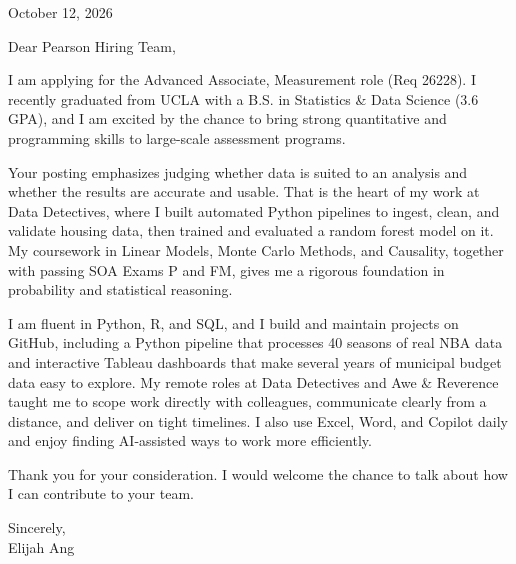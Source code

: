 \documentclass[11pt,letterpaper]{article}
\begin{document}


\vspace{12pt}

October 12, 2026

Dear Pearson Hiring Team,

I am applying for the Advanced Associate, Measurement role (Req 26228). I recently graduated from UCLA with a B.S. in Statistics \& Data Science (3.6 GPA), and I am excited by the chance to bring strong quantitative and programming skills to large-scale assessment programs.

Your posting emphasizes judging whether data is suited to an analysis and whether the results are accurate and usable. That is the heart of my work at Data Detectives, where I built automated Python pipelines to ingest, clean, and validate housing data, then trained and evaluated a random forest model on it. My coursework in Linear Models, Monte Carlo Methods, and Causality, together with passing SOA Exams P and FM, gives me a rigorous foundation in probability and statistical reasoning.

I am fluent in Python, R, and SQL, and I build and maintain projects on GitHub, including a Python pipeline that processes 40 seasons of real NBA data and interactive Tableau dashboards that make several years of municipal budget data easy to explore. My remote roles at Data Detectives and Awe \& Reverence taught me to scope work directly with colleagues, communicate clearly from a distance, and deliver on tight timelines. I also use Excel, Word, and Copilot daily and enjoy finding AI-assisted ways to work more efficiently.

Thank you for your consideration. I would welcome the chance to talk about how I can contribute to your team.

Sincerely,\\
Elijah Ang
\end{document}
